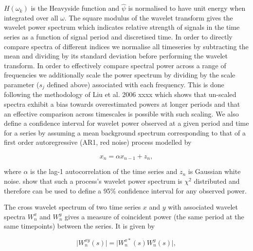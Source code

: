$H(\omega_k)$ is the Heavyside function and $\hat{\psi}$ is normalised to have unit energy when integrated over all $\omega$. The square modulus of the wavelet transform gives the wavelet power spectrum which indicates relative strength of signals in the time series as a function of signal period and discretised time. In order to directly compare spectra of different indices we normalise all timeseries by subtracting the mean and dividing by its standard deviation before performing the wavelet transform. In order to effectively compare spectral power across a range of frequencies we additionally scale the power spectrum by dividing by the scale parameter ($s_j$ defined above) associated with each frequency. This is done following the methodology of Liu et al. 2006 xxxx which shows that un-scaled spectra exhibit a bias towards overestimated powers at longer periods and that an effective comparison across timescales is possible with such scaling. We also define a confidence interval for wavelet power observed at a given period and time for a series by assuming a mean background spectrum corresponding to that of a first order autoregressive (AR1, red noise) process modelled by

\begin{equation} \label{rednoise}
x_n = \alpha x_{n - 1} + z_n,
\end{equation}

where $\alpha$ is the lag-1 autocorrelation of the time series and $z_n$ is Gaussian white noise. \cite{Torrence1998} show that such a process's wavelet power spectrum is $\chi^2$ distributed and therefore can be used to define a 95\% confidence interval for any observed power. 

The cross wavelet spectrum of two time series $x$ and $y$ with associated wavelet spectra $W^x_n$ and $W^y_n$ gives a measure of coincident power (the same period at the same timepoints) between the series. It is given by

\begin{equation} \label{wavelet_cross}
\vert W^{xy}_n(s)\vert = \vert W^{x*}_n(s) W^{y}_n(s)\vert,
\end{equation}

